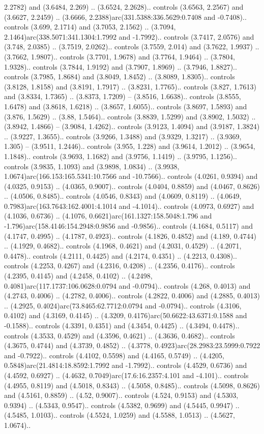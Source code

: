 2.2782) and (3.6484, 2.269) .. (3.6524, 2.2628).. controls (3.6563, 2.2567) and (3.6627, 2.2459) .. (3.6666, 2.2388)arc(331.5388:336.5629:0.7408 and -0.7408).. controls (3.699, 2.1714) and (3.7053, 2.1562) .. (3.7094, 2.1464)arc(338.5071:341.1304:1.7992 and -1.7992).. controls (3.7417, 2.0576) and (3.748, 2.0385) .. (3.7519, 2.0262).. controls (3.7559, 2.014) and (3.7622, 1.9937) .. (3.7662, 1.9807).. controls (3.7701, 1.9678) and (3.7764, 1.9464) .. (3.7804, 1.9328).. controls (3.7844, 1.9192) and (3.7907, 1.8969) .. (3.7946, 1.8827).. controls (3.7985, 1.8684) and (3.8049, 1.8452) .. (3.8089, 1.8305).. controls (3.8128, 1.8158) and (3.8191, 1.7917) .. (3.8231, 1.7765).. controls (3.827, 1.7613) and (3.8334, 1.7365) .. (3.8373, 1.7209) -- (3.8516, 1.6638).. controls (3.8555, 1.6478) and (3.8618, 1.6218) .. (3.8657, 1.6055).. controls (3.8697, 1.5893) and (3.876, 1.5629) .. (3.88, 1.5464).. controls (3.8839, 1.5299) and (3.8902, 1.5032) .. (3.8942, 1.4866) -- (3.9084, 1.4262).. controls (3.9123, 1.4094) and (3.9187, 1.3824) .. (3.9227, 1.3655).. controls (3.9266, 1.3488) and (3.9329, 1.3217) .. (3.9369, 1.305) -- (3.9511, 1.2446).. controls (3.955, 1.228) and (3.9614, 1.2012) .. (3.9654, 1.1848).. controls (3.9693, 1.1682) and (3.9756, 1.1419) .. (3.9795, 1.1256).. controls (3.9835, 1.1093) and (3.9898, 1.0834) .. (3.9938, 1.0674)arc(166.153:165.5341:10.7566 and -10.7566).. controls (4.0261, 0.9394) and (4.0325, 0.9153) .. (4.0365, 0.9007).. controls (4.0404, 0.8859) and (4.0467, 0.8626) .. (4.0506, 0.8485).. controls (4.0546, 0.8343) and (4.0609, 0.8119) .. (4.0649, 0.7983)arc(163.7643:162.4001:4.1014 and -4.1014).. controls (4.0973, 0.6927) and (4.1036, 0.6736) .. (4.1076, 0.6621)arc(161.1327:158.5048:1.796 and -1.796)arc(158.4146:154.2948:0.9856 and -0.9856).. controls (4.1684, 0.5117) and (4.1747, 0.4995) .. (4.1787, 0.4923).. controls (4.1826, 0.4852) and (4.189, 0.4744) .. (4.1929, 0.4682).. controls (4.1968, 0.4621) and (4.2031, 0.4529) .. (4.2071, 0.4478).. controls (4.2111, 0.4425) and (4.2174, 0.4351) .. (4.2213, 0.4308).. controls (4.2253, 0.4267) and (4.2316, 0.4208) .. (4.2356, 0.4176).. controls (4.2395, 0.4145) and (4.2458, 0.4102) .. (4.2498, 0.4081)arc(117.1737:106.0628:0.0794 and -0.0794).. controls (4.268, 0.4013) and (4.2743, 0.4006) .. (4.2782, 0.4006).. controls (4.2822, 0.4006) and (4.2885, 0.4013) .. (4.2925, 0.4024)arc(73.8465:62.7712:0.0794 and -0.0794).. controls (4.3106, 0.4102) and (4.3169, 0.4145) .. (4.3209, 0.4176)arc(50.6622:43.6371:0.1588 and -0.1588).. controls (4.3391, 0.4351) and (4.3454, 0.4425) .. (4.3494, 0.4478).. controls (4.3533, 0.4529) and (4.3596, 0.4621) .. (4.3636, 0.4682).. controls (4.3675, 0.4744) and (4.3739, 0.4852) .. (4.3778, 0.4923)arc(28.2983:23.5999:0.7922 and -0.7922).. controls (4.4102, 0.5598) and (4.4165, 0.5749) .. (4.4205, 0.5848)arc(21.4814:18.8592:1.7992 and -1.7992).. controls (4.4529, 0.6736) and (4.4592, 0.6927) .. (4.4632, 0.7049)arc(17.6:16.2357:4.101 and -4.101).. controls (4.4955, 0.8119) and (4.5018, 0.8343) .. (4.5058, 0.8485).. controls (4.5098, 0.8626) and (4.5161, 0.8859) .. (4.52, 0.9007).. controls (4.524, 0.9153) and (4.5303, 0.9394) .. (4.5343, 0.9547).. controls (4.5382, 0.9699) and (4.5445, 0.9947) .. (4.5485, 1.0103).. controls (4.5524, 1.0259) and (4.5588, 1.0513) .. (4.5627, 1.0674).. 